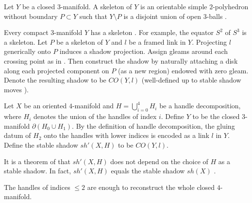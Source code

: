 \begin{definition}\label{def/skeleton-of-a-3-manifold}
  Let $Y$ be a closed $3$-manifold. A skeleton of $Y$ is an
  orientable simple $2$-polyhedron without boundary $P \subset Y$
  such that $Y \setminus P$ is a disjoint union of open
  $3$-balls \cite[p. 400]{turaev-qiok-3-manifolds}.
\end{definition}

\begin{definition}\label{def/shadow-cone-of-a-framed-link-in-a-3-manifold}
  \noindent Every compact $3$-manifold $Y$ has a skeleton
  \cite[theorem IX 2.1.1]{turaev-qiok-3-manifolds}. For example,
  the equator $S^{2}$ of $S^{3}$ is a skeleton. Let $P$ be a
  skeleton of $Y$ and $l$ be a framed link in $Y$. Projecting $l$
  generically onto $P$ induces a shadow projection. Assign gleams
  around each crossing point as in \cite[figure
  IX.3.4]{turaev-qiok-3-manifolds}. Then construct the shadow by
  naturally attaching a disk along each projected component on
  $P$ (as a new region) endowed with zero gleam. Denote the
  resulting shadow to be $CO(Y,l)$ (well-defined up to stable
  shadow moves \cite[section IX.3.3]{turaev-qiok-3-manifolds}).
\end{definition}

\begin{definition}\label{def/shadow-of-a-4-manifold-from-a-handle-decomposition}
  Let $X$ be an oriented $4$-manifold and
  $H = \bigcup_{i=0}^{4} H_{i}$ be a handle decomposition, where
  $H_{i}$ denotes the union of the handles of index $i$. Define
  $Y$ to be the closed $3$-manifold $\partial(H_{0} \cup H_{1})$.
  By the definition of handle decomposition, the gluing datum of
  $H_{2}$ onto the handles with lower indices is encoded as a
  link $l$ in $Y$. Define the stable shadow $sh'(X,H)$ to be
  $CO(Y,l)$.
\end{definition}

\begin{remark}\label{remark/stable-shadow-of-a-4-manifold}
  It is a theorem of \cite[sec.IX.4.2]{turaev-qiok-3-manifolds}
  that $sh'(X,H)$ does not depend on the choice of $H$ as a
  stable shadow. In fact, $sh'(X,H)$ equals the stable shadow
  $sh(X)$ \cite[sec. IX.7]{turaev-qiok-3-manifolds}.
\end{remark}

\begin{remark}\label{remark/reconstruction-of-4-manifolds}\cite[section 4.4]{gompf-stipsicz/4-manifolds-and-kirby-calculus}
  The handles of indices $\leq 2$ are enough to reconstruct the
  whole closed $4$-manifold.
\end{remark}

